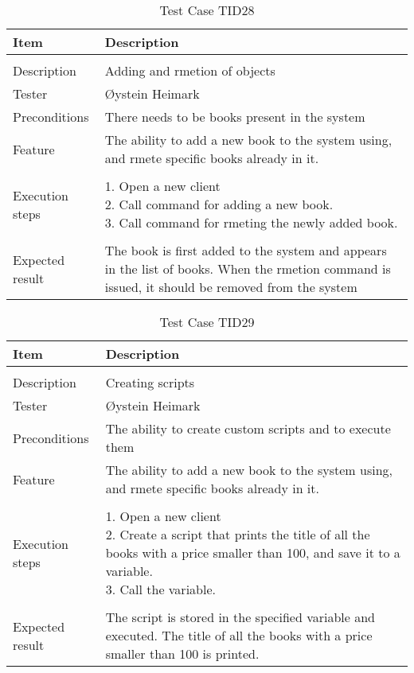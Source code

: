 \begin{table}[H]
\caption{Test Case TID28}
\centering
\begin{tabular}{ l p{13cm} }
\hline
 Item            & Description        \\
\hline \\ [-2.0ex]
 Description     & Adding and rmetion of objects \\
 Tester          & Øystein Heimark                  \\
 Preconditions   & There needs to be books present in the system\\
 Feature         & The ability to add a new book to the system using, and rmete specific books already in it.   \vspace{3pt}                     \\
\hline \\ [-1.5ex]
 Execution steps & \pbox{13cm}{1. Open a new client \\ 2. Call command for adding a new book. \\ 3. Call command for rmeting the newly added book.} \vspace{3pt} \\
\hline \\ [-1.5ex]
 Expected result & The book is first added to the system and appears in the list of books. When the rmetion command is issued, it should be removed from the system \\
\hline
\end{tabular}
\label{table:testcasetid28}
\end{table}

\begin{table}[H]
\caption{Test Case TID29}
\centering
\begin{tabular}{ l p{13cm} }
\hline
 Item            & Description        \\
\hline \\ [-2.0ex]
 Description     & Creating scripts \\
 Tester          & Øystein Heimark                  \\
 Preconditions   & The ability to create custom scripts and to execute them\\
 Feature         & The ability to add a new book to the system using, and rmete specific books already in it.   \vspace{3pt}                     \\
\hline \\ [-1.5ex]
 Execution steps & \pbox{13cm}{1. Open a new client \\ 2. Create a script that prints the title of all the books with a price smaller than 100, and save it to a variable. \\ 3. Call the variable.} \vspace{3pt} \\
\hline \\ [-1.5ex]
Expected result & The script is stored in the specified variable and executed. The title of all the books with a price smaller than 100 is printed. \\
\hline
\end{tabular}
\label{table:testcasetid29}
\end{table}

